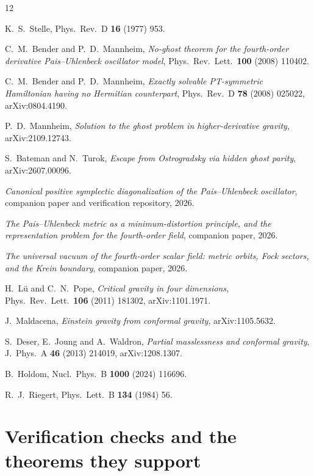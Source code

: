 \documentclass[11pt]{article}
\theoremstyle{definition}
\theoremstyle{remark}
\begin{document}
\begin{thebibliography}{12}

K.~S.~Stelle,
Phys.\ Rev.\ D \textbf{16} (1977) 953.

C.~M.~Bender and P.~D.~Mannheim,
\emph{No-ghost theorem for the fourth-order derivative Pais--Uhlenbeck
oscillator model},
Phys.\ Rev.\ Lett.\ \textbf{100} (2008) 110402.

C.~M.~Bender and P.~D.~Mannheim,
\emph{Exactly solvable PT-symmetric Hamiltonian having no Hermitian
counterpart},
Phys.\ Rev.\ D \textbf{78} (2008) 025022, arXiv:0804.4190.

P.~D.~Mannheim,
\emph{Solution to the ghost problem in higher-derivative gravity},
arXiv:2109.12743.

S.~Bateman and N.~Turok,
\emph{Escape from Ostrogradsky via hidden ghost parity},
arXiv:2607.00096.

\emph{Canonical positive symplectic diagonalization of the Pais--Uhlenbeck
oscillator}, companion paper and verification repository, 2026.

\emph{The Pais--Uhlenbeck metric as a minimum-distortion principle, and
the representation problem for the fourth-order field}, companion paper,
2026.

\emph{The universal vacuum of the fourth-order scalar field: metric
orbits, Fock sectors, and the Krein boundary}, companion paper, 2026.

H.~L\"u and C.~N.~Pope,
\emph{Critical gravity in four dimensions},
Phys.\ Rev.\ Lett.\ \textbf{106} (2011) 181302, arXiv:1101.1971.

J.~Maldacena,
\emph{Einstein gravity from conformal gravity},
arXiv:1105.5632.

S.~Deser, E.~Joung and A.~Waldron,
\emph{Partial masslessness and conformal gravity},
J.\ Phys.\ A \textbf{46} (2013) 214019, arXiv:1208.1307.

B.~Holdom,
Nucl.\ Phys.\ B \textbf{1000} (2024) 116696.

R.~J.~Riegert,
Phys.\ Lett.\ B \textbf{134} (1984) 56.

\end{thebibliography}

\appendix

\section{Verification checks and the theorems they support}
\label{app:checks}
\end{document}
